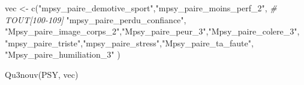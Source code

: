 \documentclass[
]{article}
\newenvironment{Shaded}{\begin{snugshade}}{\end{snugshade}}
\newcommand{\CommentTok}[1]{\textcolor[rgb]{0.56,0.35,0.01}{\textit{#1}}}
\newcommand{\FunctionTok}[1]{\textcolor[rgb]{0.00,0.00,0.00}{#1}}
\newcommand{\NormalTok}[1]{#1}
\newcommand{\OtherTok}[1]{\textcolor[rgb]{0.56,0.35,0.01}{#1}}
\newcommand{\StringTok}[1]{\textcolor[rgb]{0.31,0.60,0.02}{#1}}
\begin{document}
\begin{Shaded}
\begin{Highlighting}[]
\NormalTok{vec }\OtherTok{\textless{}{-}} \FunctionTok{c}\NormalTok{(}\StringTok{"mpsy\_paire\_demotive\_sport"}\NormalTok{,}\StringTok{"mpsy\_paire\_moins\_perf\_2"}\NormalTok{,  }\CommentTok{\# TOUT[100{-}109]}
         \StringTok{"mpsy\_paire\_perdu\_confiance"}\NormalTok{,  }
    \StringTok{"Mpsy\_paire\_image\_corps\_2"}\NormalTok{,}\StringTok{"Mpsy\_paire\_peur\_3"}\NormalTok{,}\StringTok{"Mpsy\_paire\_colere\_3"}\NormalTok{,}
    \StringTok{"mpsy\_paire\_triste"}\NormalTok{,}\StringTok{"mpsy\_paire\_stress"}\NormalTok{,}\StringTok{"Mpsy\_paire\_ta\_faute"}\NormalTok{,}
    \StringTok{"Mpsy\_paire\_humiliation\_3"}
\NormalTok{     )}

\FunctionTok{Qu3nouv}\NormalTok{(PSY, vec)}
\end{Highlighting}
\end{Shaded}
\end{document}
